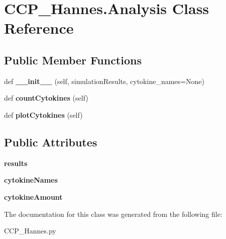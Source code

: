 \hypertarget{class_c_c_p___hannes_1_1_analysis}{}\section{C\+C\+P\+\_\+\+Hannes.\+Analysis Class Reference}
\label{class_c_c_p___hannes_1_1_analysis}
\subsection*{Public Member Functions}
\begin{DoxyCompactItemize}
\item 
\mbox{\label{class_c_c_p___hannes_1_1_analysis_a05c37e0523e8c7de03b8b808d1db1ae0}} 
def {\bfseries \+\_\+\+\_\+init\+\_\+\+\_\+} (self, simulation\+Results, cytokine\+\_\+names=None)
\item 
\mbox{\label{class_c_c_p___hannes_1_1_analysis_a914957b746c4d5d7b13daa2786cc4ae6}} 
def {\bfseries count\+Cytokines} (self)
\item 
\mbox{\label{class_c_c_p___hannes_1_1_analysis_aa008afd3924050a0634ffdde72b3e9d9}} 
def {\bfseries plot\+Cytokines} (self)
\end{DoxyCompactItemize}
\subsection*{Public Attributes}
\begin{DoxyCompactItemize}
\item 
\mbox{\label{class_c_c_p___hannes_1_1_analysis_a4cea02ae53dd6b2bc1f51af6019851fc}} 
{\bfseries results}
\item 
\mbox{\label{class_c_c_p___hannes_1_1_analysis_abbbe87ef8fd97908041d6af5cef9485d}} 
{\bfseries cytokine\+Names}
\item 
\mbox{\label{class_c_c_p___hannes_1_1_analysis_a3f3659415fcff5636549a12bf7560930}} 
{\bfseries cytokine\+Amount}
\end{DoxyCompactItemize}


The documentation for this class was generated from the following file\+:\begin{DoxyCompactItemize}
\item 
C\+C\+P\+\_\+\+Hannes.\+py\end{DoxyCompactItemize}
